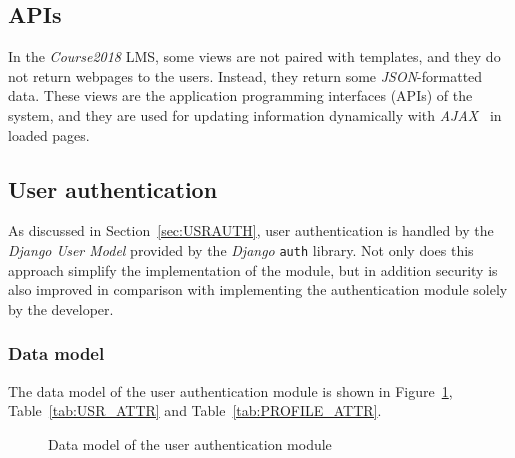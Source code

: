 








\subsection{APIs}
In the \emph{Course2018} LMS, some views are not paired with templates, and
they do not return webpages to the users.
Instead, they return some
\emph{JSON}-formatted data.
These views are the application programming interfaces (APIs) of the system,
and they are used for updating information
dynamically with \emph{AJAX}~\cite{AJAX} in loaded pages. 



\subsection{User authentication}
As discussed in Section~\ref{sec:USRAUTH}, user authentication is handled by the
\emph{Django User Model} provided by the \emph{Django} \texttt{auth} library.
Not only does this approach simplify the implementation of the module,
but in addition security is also improved in comparison with implementing the authentication
module solely by the developer.

\subsubsection{Data model}
The data model of the user authentication module is shown in
Figure~\ref{fig:AUTH_ER}, Table~\ref{tab:USR_ATTR} and
Table~\ref{tab:PROFILE_ATTR}.

\bigskip

\begin{figure}[ht]
    \centering

    \usetikzlibrary{er}

    \caption{Data model of the user authentication module}
    \label{fig:AUTH_ER}
\end{figure}


